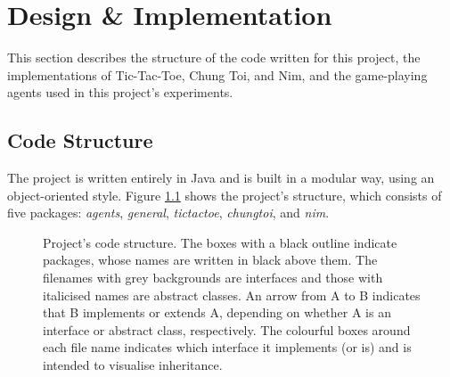 \documentclass[11pt,a4paper]{report}
\begin{document}
\chapter{Design \& Implementation}
\label{sec:DesignImpl}

This section describes the structure of the code written for this project, the implementations of Tic-Tac-Toe, Chung Toi, and Nim, and the game-playing agents used in this project's experiments.


\section{Code Structure}
\label{sec:code-structure}

The project is written entirely in Java and is built in a modular way, using an object-oriented style. Figure \ref{code-structure} shows the project's structure, which consists of five packages: \emph{agents}, \emph{general}, \emph{tictactoe}, \emph{chungtoi}, and \emph{nim}.

\begin{figure}[htbp]
	\begin{center}
		\noindent{}
		\caption{Project's code structure. The boxes with a black outline indicate packages, whose names are written in black above them. The filenames with grey backgrounds are interfaces and those with italicised names are abstract classes. An arrow from A to B indicates that B implements or extends A, depending on whether A is an interface or abstract class, respectively. The colourful boxes around each file name indicates which interface it implements (or is) and is intended to visualise inheritance.}
		\label{code-structure}
		
	\end{center}
\end{figure}
\end{document}
